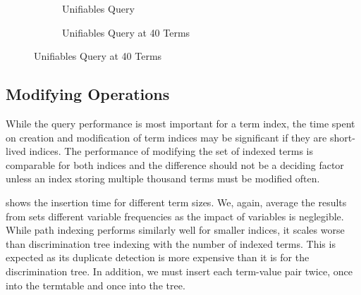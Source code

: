 \begin{figure}[h]
  \begin{subfigure}{0.45\textwidth}
\begin{adjustbox}{width=1\textwidth}
\end{adjustbox}
\caption{Unifiables Query}
\label{unif}
\end{subfigure}
\begin{subfigure}{0.1\textwidth}
\end{subfigure}
\begin{subfigure}{0.45\textwidth}
\begin{adjustbox}{width=1\textwidth}
\end{adjustbox}
\caption{Unifiables Query at 40 Terms}
\label{unifvar}
\end{subfigure}
\end{figure}

\subsection{Modifying Operations}
While the query performance is most important for a term index, the time spent on creation and modification of term indices may be significant if they are short-lived indices. The performance of modifying the set of indexed terms is comparable for both indices and the difference should not be a deciding factor unless an index storing multiple thousand terms must be modified often.

 shows the insertion time for different term sizes. We, again, average the results from sets different variable frequencies as the impact of variables is neglegible.
While path indexing performs similarly well for smaller indices, it scales worse than discrimination tree indexing with the number of indexed terms. This is expected as its duplicate detection is more expensive than it is for the discrimination tree. In addition, we must insert each term-value pair twice, once into the termtable and once into the tree.

